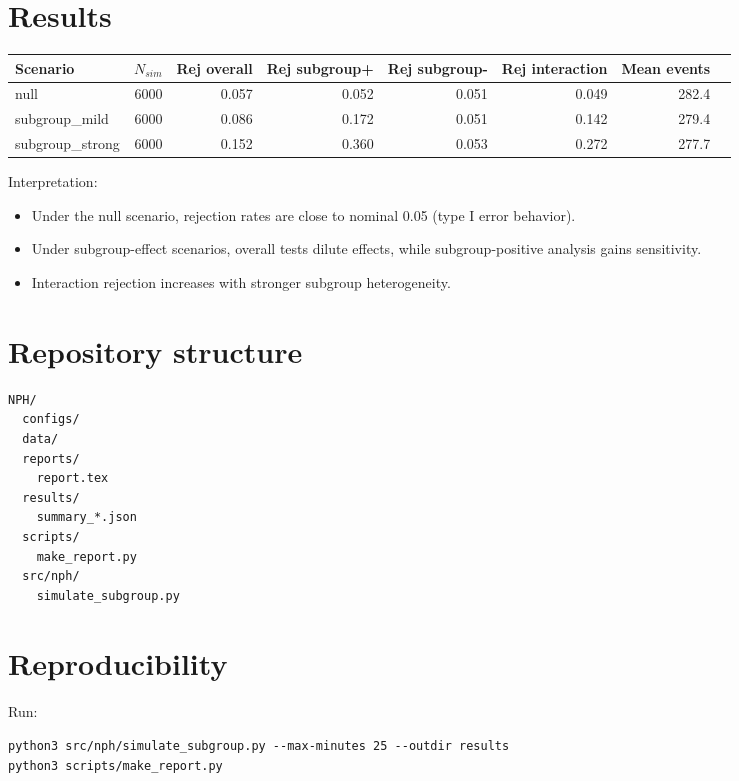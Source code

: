\documentclass[11pt]{article}
\begin{document}
\section*{Results}
\begin{center}
\begin{tabular}{lrrrrrrr}
\toprule
Scenario & $N_{sim}$ & Rej overall & Rej subgroup+ & Rej subgroup- & Rej interaction & Mean events \\
\midrule
null & 6000 & 0.057 & 0.052 & 0.051 & 0.049 & 282.4 \\
subgroup\_mild & 6000 & 0.086 & 0.172 & 0.051 & 0.142 & 279.4 \\
subgroup\_strong & 6000 & 0.152 & 0.360 & 0.053 & 0.272 & 277.7 \\
\bottomrule
\end{tabular}
\end{center}

Interpretation:
\begin{itemize}
  \item Under the null scenario, rejection rates are close to nominal 0.05 (type I error behavior).
  \item Under subgroup-effect scenarios, overall tests dilute effects, while subgroup-positive analysis gains sensitivity.
  \item Interaction rejection increases with stronger subgroup heterogeneity.
\end{itemize}

\section*{Repository structure}
\begin{verbatim}
NPH/
  configs/
  data/
  reports/
    report.tex
  results/
    summary_*.json
  scripts/
    make_report.py
  src/nph/
    simulate_subgroup.py
\end{verbatim}

\section*{Reproducibility}
Run:
\begin{verbatim}
python3 src/nph/simulate_subgroup.py --max-minutes 25 --outdir results
python3 scripts/make_report.py
\end{verbatim}
\end{document}
